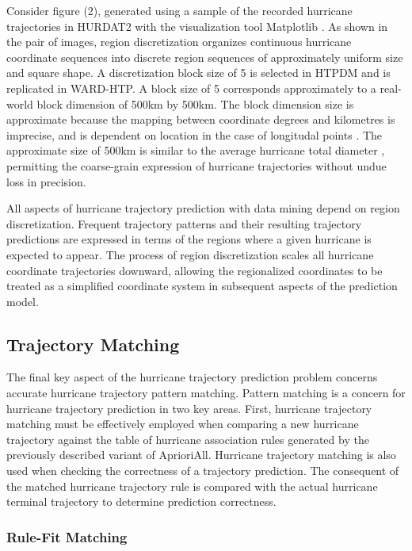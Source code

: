 \documentclass[12pt,conference]{IEEEtran}
\begin{document}
Consider figure (2), generated using a sample of the recorded hurricane trajectories in HURDAT2 with the visualization tool Matplotlib \cite{matplotlib}. As shown in the pair of images, region discretization organizes continuous hurricane coordinate sequences into discrete region sequences of approximately uniform size and square shape. A discretization block size of 5 is selected in HTPDM and is replicated in WARD-HTP. A block size of 5 corresponds approximately to a real-world block dimension of 500km by 500km. The block dimension size is approximate because the mapping between coordinate degrees and kilometres is imprecise, and is dependent on location in the case of longitudal points \cite{lat-long-distance}. The approximate size of 500km is similar to the average hurricane total diameter \cite{hurricane-distances}, permitting the coarse-grain expression of hurricane trajectories without undue loss in precision.

All aspects of hurricane trajectory prediction with data mining depend on region discretization. Frequent trajectory patterns and their resulting trajectory predictions are expressed in terms of the regions where a given hurricane is expected to appear. The process of region discretization scales all hurricane coordinate trajectories downward, allowing the regionalized coordinates to be treated as a simplified coordinate system in subsequent aspects of the prediction model.

\subsection{Trajectory Matching}

The final key aspect of the hurricane trajectory prediction problem concerns accurate hurricane trajectory pattern matching. Pattern matching is a concern for hurricane trajectory prediction in two key areas. First, hurricane trajectory matching must be effectively employed when comparing a new hurricane trajectory against the table of hurricane association rules generated by the previously described variant of AprioriAll. Hurricane trajectory matching is also used when checking the correctness of a trajectory prediction. The consequent of the matched hurricane trajectory rule is compared with the actual hurricane terminal trajectory to determine prediction correctness.

\subsubsection{Rule-Fit Matching}
\end{document}
